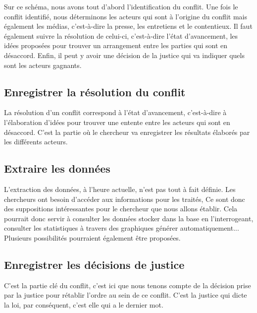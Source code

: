 \documentclass[12pt,a4paper]{article}
\newcommand{\sommaire}{\shorttoc{Sommaire}{2}}
\begin{document}
Sur ce schéma, nous avons tout d'abord l'identification du conflit. Une fois le conflit identifié, nous déterminons les acteurs qui sont à l'origine du conflit mais également les médias, c'est-à-dire la presse, les entretiens et le contentieux. Il faut également suivre la résolution de celui-ci, c'est-à-dire l'état d'avancement, les idées proposées pour trouver un arrangement entre les parties qui sont en désaccord. Enfin, il peut y avoir une décision de la justice qui va indiquer quels sont les acteurs gagnants. 

\subsection{Enregistrer la résolution du conflit}
La résolution d'un conflit correspond à l'état d'avancement, c'est-à-dire à l'élaboration d'idées pour trouver une entente entre les acteurs qui sont en désaccord. C'est la partie où le chercheur va enregistrer les résultats élaborés par les différents acteurs.

\subsection{Extraire les données}
L'extraction des données, à l'heure actuelle, n'est pas tout à fait définie. 
Les chercheurs ont besoin d'accéder aux informations pour les traités, 
Ce sont donc des suppositions intéressantes pour le chercheur que nous allons établir. Cela pourrait donc servir à consulter les données stocker dans la base en l'interrogeant, consulter les statistiques à travers des graphiques générer automatiquement... Plusieurs possibilités pourraient également être proposées.

\subsection{Enregistrer les décisions de justice}
C'est la partie clé du conflit, c'est ici que nous tenons compte de la décision prise par la justice pour rétablir l'ordre au sein de ce conflit. C'est la justice qui dicte la loi, par conséquent, c'est elle qui a le dernier mot.



\end{document}
